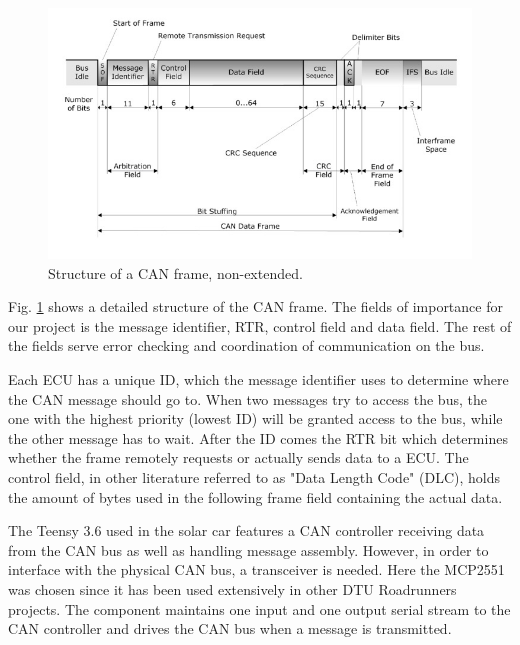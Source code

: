 \documentclass[a4paper,conference]{IEEEtran}
\begin{document}
\begin{figure}[t]
    \centering
    \includegraphics[width=\linewidth]{documentation/images/detailed-can-data-frame-architecture.jpg}
    \caption{Structure of a CAN frame, non-extended.}
    \label{fig:CANframe}
\end{figure}

Fig. \ref{fig:CANframe} shows a detailed structure of the CAN frame. The fields of importance for our project is the message identifier, RTR, control field and data field. The rest of the fields serve error checking and coordination of communication on the bus.

Each ECU has a unique ID, which the message identifier uses to determine where the CAN message should go to. When two messages try to access the bus, the one with the highest priority (lowest ID) will be granted access to the bus, while the other message has to wait. After the ID comes the RTR bit which determines whether the frame remotely requests or actually sends data to a ECU. The control field, in other literature referred to as "Data Length Code" (DLC), holds the amount of bytes used in the following frame field containing the actual data\cite{DS_ISO}\cite{css}.


The Teensy 3.6 used in the solar car features a CAN controller receiving data from the CAN bus as well as handling message assembly. However, in order to interface with the physical CAN bus, a transceiver is needed. Here the MCP2551 was chosen since it has been used extensively in other DTU Roadrunners projects. The component maintains one input and one output serial stream to the CAN controller and drives the CAN bus when a message is transmitted.
\end{document}

